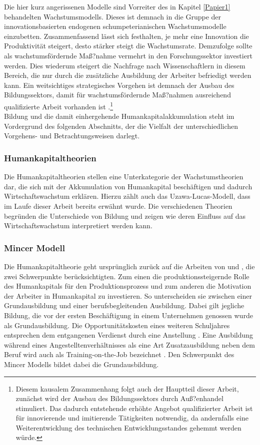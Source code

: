 %
Die hier kurz angerissenen Modelle sind Vorreiter des in Kapitel \ref{Papier1} behandelten Wachstumsmodells. Dieses ist demnach in die Gruppe der innovationsbasierten endogenen schumpeterianischen Wachstumsmodelle einzubetten. 
%
Zusammenfassend lässt sich festhalten, je mehr eine Innovation die Produktivität steigert, desto stärker steigt die Wachstumsrate. Demzufolge sollte als wachstumsfördernde Maß?nahme vermehrt in den Forschungssektor investiert werden. Dies wiederum steigert die Nachfrage nach Wissenschaftlern in diesem Bereich, die nur durch die zusätzliche Ausbildung der Arbeiter befriedigt werden kann. Ein weitsichtiges strategisches Vorgehen ist demnach der Ausbau des Bildungssektors, damit für wachstumsfördernde Maß?nahmen ausreichend qualifizierte Arbeit vorhanden ist \cite[Kapitel 4]{Aghion.2015}.\footnote{Diesem kausalem Zusammenhang folgt auch der Hauptteil dieser Arbeit, zunächst wird der Ausbau des Bildungssektors durch Auß?enhandel stimuliert. Das dadurch entstehende erhöhte Angebot qualifizierter Arbeit ist für innovierende und imitierende Tätigkeiten notwendig, da andernfalls eine Weiterentwicklung des technischen Entwicklungsstandes gehemmt werden würde.} \\
%
Bildung und die damit einhergehende Humankapitalakkumulation steht im Vordergrund des folgenden Abschnitts, der die Vielfalt der unterschiedlichen Vorgehens- und Betrachtungsweisen darlegt. 
%
\subsubsection{Humankapitaltheorien}
Die Humankapitaltheorien stellen eine Unterkategorie der Wachstumstheorien dar, die sich mit der Akkumulation von Humankapital beschäftigen und dadurch Wirtschaftswachstum erklären. Hierzu zählt auch das Uzawa-Lucas-Modell, dass im Laufe dieser Arbeit bereits erwähnt wurde. Die verschiedenen Theorien begründen die Unterschiede von Bildung und zeigen wie deren Einfluss auf das Wirtschaftswachstum interpretiert werden kann.
%
\subsubsection*{Mincer Modell}
Die Humankapitaltheorie geht ursprünglich zurück auf die Arbeiten von \cite{Becker.1965} und \cite{Mincer.1974}, die zwei Schwerpunkte berücksichtigten. Zum einen die  produktionssteigernde Rolle des Humankapitals für den Produktionsprozess und zum anderen die Motivation der Arbeiter in Humankapital zu investieren. So unterscheiden sie zwischen einer Grundausbildung und einer berufsbegleitenden Ausbildung. Dabei gilt jegliche Bildung, die vor der ersten Beschäftigung in einem Unternehmen genossen wurde als Grundausbildung. Die Opportunitätskosten eines weiteren Schuljahres entsprechen dem entgangenen Verdienst durch eine Anstellung \cite{Mincer.1974}. Eine Ausbildung während eines Angestelltenverhältnisses als eine Art Zusatzausbildung neben dem Beruf wird auch als Training-on-the-Job bezeichnet \cite{Acemoglu.2009}. Den Schwerpunkt des Mincer Modells bildet dabei die Grundausbildung.
%

